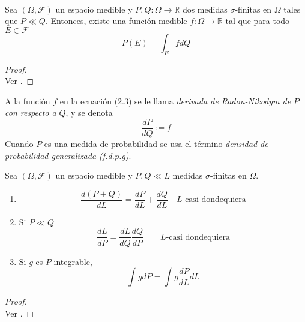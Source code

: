 \documentclass[main.tex]{subfiles}
\begin{document}
\begin{theorem} \ \\
Sea $(\Omega, \mathcal{F})$  un espacio medible y $P, Q: \Omega \to \overline{\mathbb{R}}$ dos medidas $\sigma$-finitas en $\Omega$ tales que $P \ll Q$. Entonces, existe una función medible $f: \Omega \to \overline{\mathbb{R}}$ tal que para todo $E \in \mathcal{F}$
\begin{equation}
	P(E) = \int_E f dQ
\end{equation}
\end{theorem}
\begin{proof} \ \\
Ver \cite{bernardo}.	
\end{proof}


\begin{definition}
A la función $f$ en la ecuación (2.3) se le llama \textit{derivada de Radon-Nikodym de} $P$ \textit{con respecto a} $Q$, y se denota 
\begin{equation*}
\frac{dP}{dQ} := f
\end{equation*}
Cuando $P$ es una medida de probabilidad se usa el término \textit{densidad de probabilidad generalizada (f.d.p.g)}.
\end{definition}

\begin{prop}
	Sea $(\Omega, \mathcal{F})$ un espacio medible y $P, Q \ll L$ medidas $\sigma$-finitas en $\Omega$. 
	\begin{enumerate}[label=\roman*.]
		\item 
			\begin{equation*}
				\frac{d(P+Q)}{dL}=\frac{dP}{dL}+\frac{dQ}{dL}\quad L\text{-casi dondequiera}
			\end{equation*}
		\item Si $P\ll Q$
			\begin{equation*}
				\frac{dL}{dP} = \frac{dL}{dQ}\frac{dQ}{dP} \qquad L\text{-casi dondequiera}
			\end{equation*}
		\item Si $g$ es $P$-integrable,
			\begin{equation*}
				\int g dP=\int g \frac{dP}{dL}dL
			\end{equation*}
	\end{enumerate}
\end{prop}
\begin{proof} \ \\
Ver \cite{bernardo}.	
\end{proof}
\end{document}
